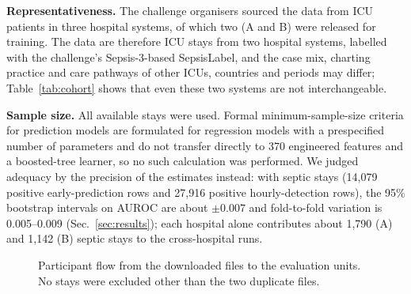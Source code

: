 \documentclass[preprint,12pt]{elsarticle}
\begin{document}
\textbf{Representativeness.} The challenge organisers sourced the data from ICU patients in three hospital systems, of which two (A and B) were released for training. The data are therefore ICU stays from two hospital systems, labelled with the challenge's Sepsis-3-based SepsisLabel, and the case mix, charting practice and care pathways of other ICUs, countries and periods may differ; Table~\ref{tab:cohort} shows that even these two systems are not interchangeable.

\textbf{Sample size.} All available stays were used. Formal minimum-sample-size criteria for prediction models are formulated for regression models with a prespecified number of parameters and do not transfer directly to 370 engineered features and a boosted-tree learner, so no such calculation was performed. We judged adequacy by the precision of the estimates instead: with \NSeptic{} septic stays (14{,}079 positive early-prediction rows and 27{,}916 positive hourly-detection rows), the 95\% bootstrap intervals on AUROC are about $\pm0.007$ and fold-to-fold variation is 0.005--0.009 (Sec.~\ref{sec:results}); each hospital alone contributes about 1{,}790 (A) and 1{,}142 (B) septic stays to the cross-hospital runs.

\begin{figure}[!t]
\centering
{}
\caption{Participant flow from the downloaded files to the evaluation units. No stays were excluded other than the two duplicate files.}
\label{fig:flow}
\end{figure}
\end{document}
